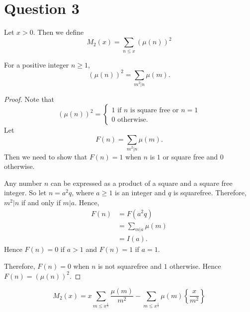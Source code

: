 \documentclass{unswmaths}
\begin{document}
\section*{Question 3}
\begin{definition}
    Let $x > 0$. Then we define
    \begin{equation*}
        M_2(x) = \sum_{n\leq x} (\mu(n))^2
    \end{equation*}
\end{definition}
\begin{lemma}
\label{M2Alt}
    For a positive integer $n \geq 1$,
    \begin{equation*}
        (\mu(n))^2 = \sum_{m^2|n} \mu(m).
    \end{equation*}
\end{lemma}
\begin{proof}
    Note that
    \begin{equation*}
        (\mu(n))^2 = \begin{cases}
            1\text{ if }n\text{ is square free or }n = 1\\
            0\text{ otherwise.}
        \end{cases}
    \end{equation*}
    Let 
    \begin{equation*}
        F(n) = \sum_{m^2|n} \mu(m).
    \end{equation*}
    Then we need to show that $F(n) = 1$ when $n$ is $1$ or square free 
    and $0$ otherwise.
    
    Any number $n$ can be expressed as a product of a square and a square
    free integer. So let $n = a^2q$, where $a \geq 1$ is an integer 
    and $q$ is squarefree. Therefore,  $m^2|n$ if and only if $m|a$. Hence,
    \begin{align*}
        F(n) &= F(a^2q)\\
             &= \sum_{m|a}\mu(m)\\
             &= I(a).
    \end{align*}
    Hence $F(n) = 0$ if $a > 1$ and $F(n) = 1$ if $a = 1$.
    
    Therefore, $F(n) = 0$ when $n$ is not squarefree and $1$ otherwise.
    Hence $F(n) = (\mu(n))^2$.
\end{proof}
\begin{lemma}
    \begin{equation*}
        M_2(x) = x\sum_{m\leq x^\frac{1}{2}} \frac{\mu(m)}{m^2}-\sum_{m\leq x^\frac{1}{2}}\mu(m)\left\{\frac{x}{m^2}\right\}
    \end{equation*}
\end{lemma}
\end{document}
